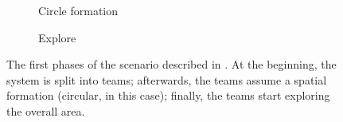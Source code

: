 \begin{figure}[t]
\begin{subfigure}{0.29\textwidth}
  \caption{Circle formation}
  \label{fig:circle-formation}
\end{subfigure}
\hfill
\begin{subfigure}{0.29\textwidth}
  \centering
  \caption{Explore}
  \label{fig:explore}
\end{subfigure}
\caption[\MacroSwarm{} graphical simulations example]{The first phases of the scenario described in . 
 At the beginning, the system is split into teams; 
 afterwards, the teams assume a spatial formation (circular, in this case);
 finally, the teams start exploring the overall area.}\label{fig:scenario}
\end{figure}

